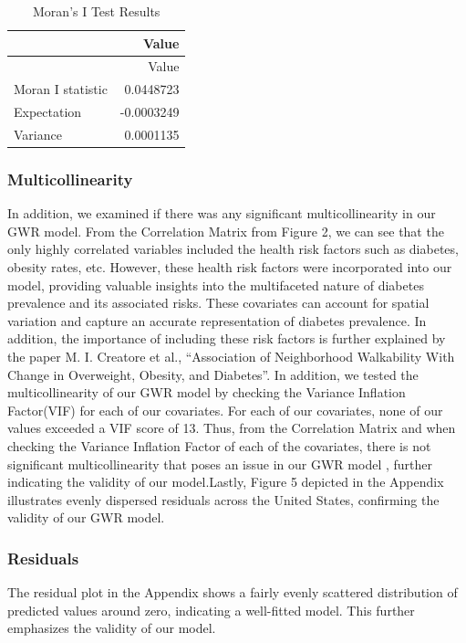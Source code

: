 \documentclass[
]{article}
\begin{document}
\begin{longtable}[]{@{}lr@{}}
\caption{Moran's I Test Results}\tabularnewline
\toprule\noalign{}
& Value \\
\midrule\noalign{}
\endfirsthead
\toprule\noalign{}
& Value \\
\midrule\noalign{}
\endhead
\bottomrule\noalign{}
\endlastfoot
Moran I statistic & 0.0448723 \\
Expectation & -0.0003249 \\
Variance & 0.0001135 \\
\end{longtable}

\subsubsection{Multicollinearity}\label{multicollinearity}

In addition, we examined if there was any significant multicollinearity
in our GWR model. From the Correlation Matrix from Figure 2, we can see
that the only highly correlated variables included the health risk
factors such as diabetes, obesity rates, etc. However, these health risk
factors were incorporated into our model, providing valuable insights
into the multifaceted nature of diabetes prevalence and its associated
risks. These covariates can account for spatial variation and capture an
accurate representation of diabetes prevalence. In addition, the
importance of including these risk factors is further explained by the
paper M. I. Creatore et al., ``Association of Neighborhood Walkability
With Change in Overweight, Obesity, and Diabetes''. In addition, we
tested the multicollinearity of our GWR model by checking the Variance
Inflation Factor(VIF) for each of our covariates. For each of our
covariates, none of our values exceeded a VIF score of 13. Thus, from
the Correlation Matrix and when checking the Variance Inflation Factor
of each of the covariates, there is not significant multicollinearity
that poses an issue in our GWR model , further indicating the validity
of our model.Lastly, Figure 5 depicted in the Appendix illustrates
evenly dispersed residuals across the United States, confirming the
validity of our GWR model.

\subsubsection{Residuals}\label{residuals}

The residual plot in the Appendix shows a fairly evenly scattered
distribution of predicted values around zero, indicating a well-fitted
model. This further emphasizes the validity of our model.
\end{document}
